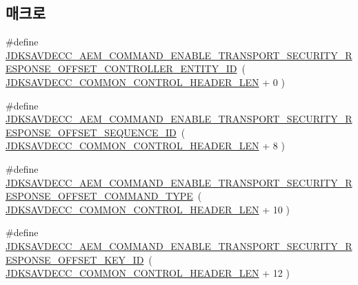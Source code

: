 \subsection*{매크로}
\begin{DoxyCompactItemize}
\item 
\#define \hyperlink{group__command__enable__transport__security__response_ga7184a97789d2d03904643653996e1b84}{J\+D\+K\+S\+A\+V\+D\+E\+C\+C\+\_\+\+A\+E\+M\+\_\+\+C\+O\+M\+M\+A\+N\+D\+\_\+\+E\+N\+A\+B\+L\+E\+\_\+\+T\+R\+A\+N\+S\+P\+O\+R\+T\+\_\+\+S\+E\+C\+U\+R\+I\+T\+Y\+\_\+\+R\+E\+S\+P\+O\+N\+S\+E\+\_\+\+O\+F\+F\+S\+E\+T\+\_\+\+C\+O\+N\+T\+R\+O\+L\+L\+E\+R\+\_\+\+E\+N\+T\+I\+T\+Y\+\_\+\+ID}~( \hyperlink{group__jdksavdecc__avtp__common__control__header_gaae84052886fb1bb42f3bc5f85b741dff}{J\+D\+K\+S\+A\+V\+D\+E\+C\+C\+\_\+\+C\+O\+M\+M\+O\+N\+\_\+\+C\+O\+N\+T\+R\+O\+L\+\_\+\+H\+E\+A\+D\+E\+R\+\_\+\+L\+EN} + 0 )
\item 
\#define \hyperlink{group__command__enable__transport__security__response_ga8cfc3046a488fb8ef87dd6be5cbae236}{J\+D\+K\+S\+A\+V\+D\+E\+C\+C\+\_\+\+A\+E\+M\+\_\+\+C\+O\+M\+M\+A\+N\+D\+\_\+\+E\+N\+A\+B\+L\+E\+\_\+\+T\+R\+A\+N\+S\+P\+O\+R\+T\+\_\+\+S\+E\+C\+U\+R\+I\+T\+Y\+\_\+\+R\+E\+S\+P\+O\+N\+S\+E\+\_\+\+O\+F\+F\+S\+E\+T\+\_\+\+S\+E\+Q\+U\+E\+N\+C\+E\+\_\+\+ID}~( \hyperlink{group__jdksavdecc__avtp__common__control__header_gaae84052886fb1bb42f3bc5f85b741dff}{J\+D\+K\+S\+A\+V\+D\+E\+C\+C\+\_\+\+C\+O\+M\+M\+O\+N\+\_\+\+C\+O\+N\+T\+R\+O\+L\+\_\+\+H\+E\+A\+D\+E\+R\+\_\+\+L\+EN} + 8 )
\item 
\#define \hyperlink{group__command__enable__transport__security__response_ga07b76b90079accbbaee54ed0c9ef094c}{J\+D\+K\+S\+A\+V\+D\+E\+C\+C\+\_\+\+A\+E\+M\+\_\+\+C\+O\+M\+M\+A\+N\+D\+\_\+\+E\+N\+A\+B\+L\+E\+\_\+\+T\+R\+A\+N\+S\+P\+O\+R\+T\+\_\+\+S\+E\+C\+U\+R\+I\+T\+Y\+\_\+\+R\+E\+S\+P\+O\+N\+S\+E\+\_\+\+O\+F\+F\+S\+E\+T\+\_\+\+C\+O\+M\+M\+A\+N\+D\+\_\+\+T\+Y\+PE}~( \hyperlink{group__jdksavdecc__avtp__common__control__header_gaae84052886fb1bb42f3bc5f85b741dff}{J\+D\+K\+S\+A\+V\+D\+E\+C\+C\+\_\+\+C\+O\+M\+M\+O\+N\+\_\+\+C\+O\+N\+T\+R\+O\+L\+\_\+\+H\+E\+A\+D\+E\+R\+\_\+\+L\+EN} + 10 )
\item 
\#define \hyperlink{group__command__enable__transport__security__response_ga8ea74355019298fb5e345ab179a6b4c8}{J\+D\+K\+S\+A\+V\+D\+E\+C\+C\+\_\+\+A\+E\+M\+\_\+\+C\+O\+M\+M\+A\+N\+D\+\_\+\+E\+N\+A\+B\+L\+E\+\_\+\+T\+R\+A\+N\+S\+P\+O\+R\+T\+\_\+\+S\+E\+C\+U\+R\+I\+T\+Y\+\_\+\+R\+E\+S\+P\+O\+N\+S\+E\+\_\+\+O\+F\+F\+S\+E\+T\+\_\+\+K\+E\+Y\+\_\+\+ID}~( \hyperlink{group__jdksavdecc__avtp__common__control__header_gaae84052886fb1bb42f3bc5f85b741dff}{J\+D\+K\+S\+A\+V\+D\+E\+C\+C\+\_\+\+C\+O\+M\+M\+O\+N\+\_\+\+C\+O\+N\+T\+R\+O\+L\+\_\+\+H\+E\+A\+D\+E\+R\+\_\+\+L\+EN} + 12 )

\end{DoxyCompactItemize}
